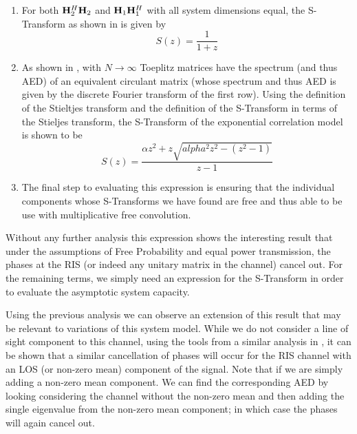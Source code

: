 \begin{enumerate}
\item 
	For both $\mathbf{H}_{2}^H \mathbf{H}_{2}$ and $\mathbf{H}_{1}\mathbf{H}_{1}^H$ with all system dimensions equal, the S-Transform as shown in \cite{muller2002random} is given by 
	\begin{equation}
	S(z) = \frac{1}{1+z}
	\end{equation}
\item 
	As shown in \cite{gray2006toeplitz}, with $N \rightarrow \infty$ Toeplitz matrices have the spectrum (and thus AED) of an equivalent circulant matrix (whose spectrum and thus AED is given by the discrete Fourier transform of the first row). Using the definition of the Stieltjes transform and the definition of the S-Transform in terms of the Stieljes transform, the S-Transform of the exponential correlation model is shown to be \cite{skupch2005free}
	\begin{equation}
	S(z) = \frac{\alpha z^2 + z \sqrt{alpha^2 z^2 -(z^2-1)}}{z-1}
	\end{equation}
\item
	The final step to evaluating this expression is ensuring that the individual components whose S-Transforms we have found are free and thus able to be use with multiplicative free convolution. 	
\end{enumerate}
\par
Without any further analysis this expression shows the interesting result that under the assumptions of Free Probability and equal power transmission, the phases at the RIS (or indeed any unitary matrix in the channel) cancel out. For the remaining terms, we simply need an expression for the S-Transform in order to evaluate the asymptotic system capacity.
\par 
Using the previous analysis we can observe an extension of this result that may be relevant to variations of this system model. 
While we do not consider a line of sight component to this channel, using the tools from a similar analysis in \cite{}, it can be shown that 
a similar cancellation of phases will occur for the RIS channel with an LOS (or non-zero mean) component of the signal.
Note that if we are simply adding a non-zero mean component. We can find the corresponding AED by looking considering the channel without the non-zero mean and then adding the single eigenvalue from the non-zero mean component; in which case the phases will again cancel out. 



